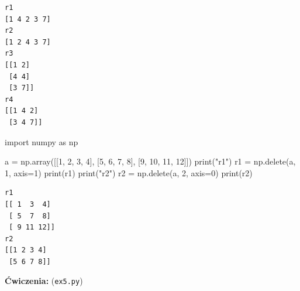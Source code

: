 \documentclass[
  letterpaper,
  DIV=11,
  numbers=noendperiod]{scrreprt}
\newenvironment{Shaded}{\begin{snugshade}}{\end{snugshade}}
\newcommand{\BuiltInTok}[1]{\textcolor[rgb]{0.00,0.23,0.31}{#1}}
\newcommand{\DecValTok}[1]{\textcolor[rgb]{0.68,0.00,0.00}{#1}}
\newcommand{\ImportTok}[1]{\textcolor[rgb]{0.00,0.46,0.62}{#1}}
\newcommand{\NormalTok}[1]{\textcolor[rgb]{0.00,0.23,0.31}{#1}}
\newcommand{\OperatorTok}[1]{\textcolor[rgb]{0.37,0.37,0.37}{#1}}
\newcommand{\StringTok}[1]{\textcolor[rgb]{0.13,0.47,0.30}{#1}}
\begin{document}
\begin{verbatim}
r1
[1 4 2 3 7]
r2
[1 2 4 3 7]
r3
[[1 2]
 [4 4]
 [3 7]]
r4
[[1 4 2]
 [3 4 7]]
\end{verbatim}

\begin{Shaded}
\begin{Highlighting}[]
\ImportTok{import}\NormalTok{ numpy }\ImportTok{as}\NormalTok{ np}

\NormalTok{a }\OperatorTok{=}\NormalTok{ np.array([[}\DecValTok{1}\NormalTok{, }\DecValTok{2}\NormalTok{, }\DecValTok{3}\NormalTok{, }\DecValTok{4}\NormalTok{], [}\DecValTok{5}\NormalTok{, }\DecValTok{6}\NormalTok{, }\DecValTok{7}\NormalTok{, }\DecValTok{8}\NormalTok{], [}\DecValTok{9}\NormalTok{, }\DecValTok{10}\NormalTok{, }\DecValTok{11}\NormalTok{, }\DecValTok{12}\NormalTok{]])}
\BuiltInTok{print}\NormalTok{(}\StringTok{"r1"}\NormalTok{)}
\NormalTok{r1 }\OperatorTok{=}\NormalTok{ np.delete(a, }\DecValTok{1}\NormalTok{, axis}\OperatorTok{=}\DecValTok{1}\NormalTok{)}
\BuiltInTok{print}\NormalTok{(r1)}
\BuiltInTok{print}\NormalTok{(}\StringTok{"r2"}\NormalTok{)}
\NormalTok{r2 }\OperatorTok{=}\NormalTok{ np.delete(a, }\DecValTok{2}\NormalTok{, axis}\OperatorTok{=}\DecValTok{0}\NormalTok{)}
\BuiltInTok{print}\NormalTok{(r2)}
\end{Highlighting}
\end{Shaded}

\begin{verbatim}
r1
[[ 1  3  4]
 [ 5  7  8]
 [ 9 11 12]]
r2
[[1 2 3 4]
 [5 6 7 8]]
\end{verbatim}

\textbf{Ćwiczenia:} (\texttt{ex5.py})
\end{document}
